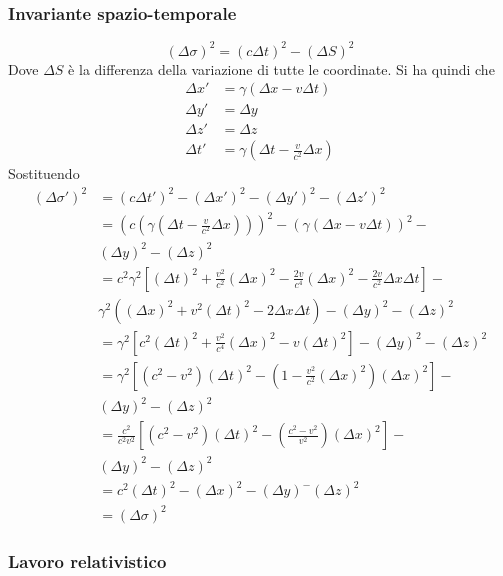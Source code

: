 \subsubsection{Invariante spazio-temporale}
\begin{equation*}
  {(\Delta\sigma)}^2={(c\Delta t)}^2-{(\Delta S)}^2
\end{equation*}
Dove $\Delta S$ è la differenza della variazione di tutte le coordinate. Si ha quindi che
\begin{align*}
  \Delta x' &= \gamma(\Delta x-v\Delta t)\\
  \Delta y' &= \Delta y\\
  \Delta z' &= \Delta z\\
  \Delta t' &= \gamma \left( \Delta t-\frac{v}{c^2}\Delta x \right)
\end{align*}
Sostituendo
\begin{align*}
  {(\Delta\sigma')}^2 
  &= {(c\Delta t')}^2-{(\Delta x')}^2-{(\Delta y')}^2-{(\Delta z')}^2\\
  &= {\left(c\left(\gamma \left( \Delta t-\frac{v}{c^2}\Delta x \right)\right)\right)}^2-
  {\left( \gamma \left( \Delta x-v\Delta t \right) \right)}^2-\\
  &{(\Delta y)}^2-{(\Delta z)}^2\\
  &= c^2\gamma^2 \left[ {(\Delta t)}^2+\frac{v^2}{c^2}{(\Delta x)}^2-\frac{2v}{c^4}{(\Delta x)}^2 -
\frac{2v}{c^2}\Delta x\Delta t\right]-\\
&\gamma^2({(\Delta x)}^2+v^2{(\Delta t)}^2-2\Delta x\Delta t)-{(\Delta y)}^2-{(\Delta z)}^2\\
&=\gamma^2 \left[ c^2{(\Delta t)}^2+\frac{v^2}{c^4}{(\Delta x)}^2-v{(\Delta t)}^2 \right]-
{(\Delta y)}^2-{(\Delta z)}^2\\
&=\gamma^2 \left[ (c^2-v^2){(\Delta t)}^2-\left( 1-\frac{v^2}{c^2}
  {(\Delta x)}^2 \right){(\Delta x)}^2 \right]-\\
  &{(\Delta y)}^2-
  {(\Delta z)}^2\\
  &=\frac{c^2}{c^2v^2}\left[ (c^2-v^2){(\Delta t)}^2-\left( \frac{c^2-v^2}{v^2}
  \right){(\Delta x)}^2 \right]-\\
  &{(\Delta y)}^2-{(\Delta z)}^2\\
  &=c^2{(\Delta t)}^2-{(\Delta x)}^2-{(\Delta y)}^-{(\Delta z)}^2\\
  &={(\Delta\sigma)}^2
\end{align*}

\subsubsection{Lavoro relativistico}
